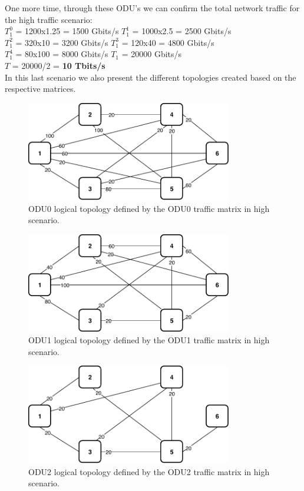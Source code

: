 One more time, through these ODU's we can confirm the total network traffic for the high traffic scenario:\\

\texttt{}$T_1^0$ = 1200x1.25 = 1500 Gbits/s \qquad
$T_1^1$ = 1000x2.5 = 2500 Gbits/s \\

$T_1^2$ = 320x10 = 3200 Gbits/s \qquad
$T_1^3$ = 120x40 = 4800 Gbits/s \\

$T_1^4$ = 80x100 = 8000 Gbits/s \qquad
$T_{1}$ = 20000 Gbits/s \\

$T$ = 20000/2 = \textbf{10 Tbits/s}\\

In this last scenario we also present the different topologies created based on the respective matrices.

\begin{figure}[h!]
\centering
\includegraphics[width=9cm]{sdf/ilp/opaque_survivability/figures/logical_topology_ODU0_high}
\caption{ODU0 logical topology defined by the ODU0 traffic matrix in high scenario.}
\label{logical_ODU0_high}
\end{figure}

\begin{figure}[h!]
\centering
\includegraphics[width=9cm]{sdf/ilp/opaque_survivability/figures/logical_topology_ODU1_high}
\caption{ODU1 logical topology defined by the ODU1 traffic matrix in high scenario.}
\label{logical_ODU1_high}
\end{figure}

\begin{figure}[h!]
\centering
\includegraphics[width=9cm]{sdf/ilp/opaque_survivability/figures/logical_topology_ODU2_high}
\caption{ODU2 logical topology defined by the ODU2 traffic matrix in high scenario.}
\label{logical_ODU2_high}
\end{figure}

